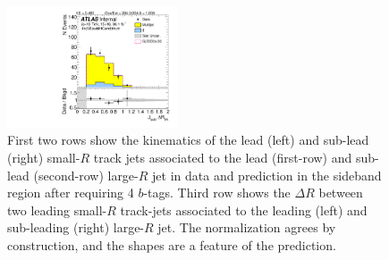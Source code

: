 \begin{figure}[htbp!]
\begin{center}
\includegraphics[angle=270, width=0.45\textwidth]{./figures/boosted/Sideband/b77_FourTag_Sideband_sublHCand_trk_dr.pdf}
  \caption{First two rows show the kinematics of the lead (left) and sub-lead (right) small-$R$ track jets associated to the lead (first-row) and sub-lead (second-row) large-$R$ jet in data and prediction in the sideband region after requiring 4 $b$-tags. Third row shows the $\Delta R$ between two leading small-$R$ track-jets associated to the leading (left) and sub-leading (right) large-$R$ jet. The normalization agrees by construction, and the shapes are a feature of the prediction. }
  \label{fig:boosted-4b-sideband-ak2}
\end{center}
\end{figure}


